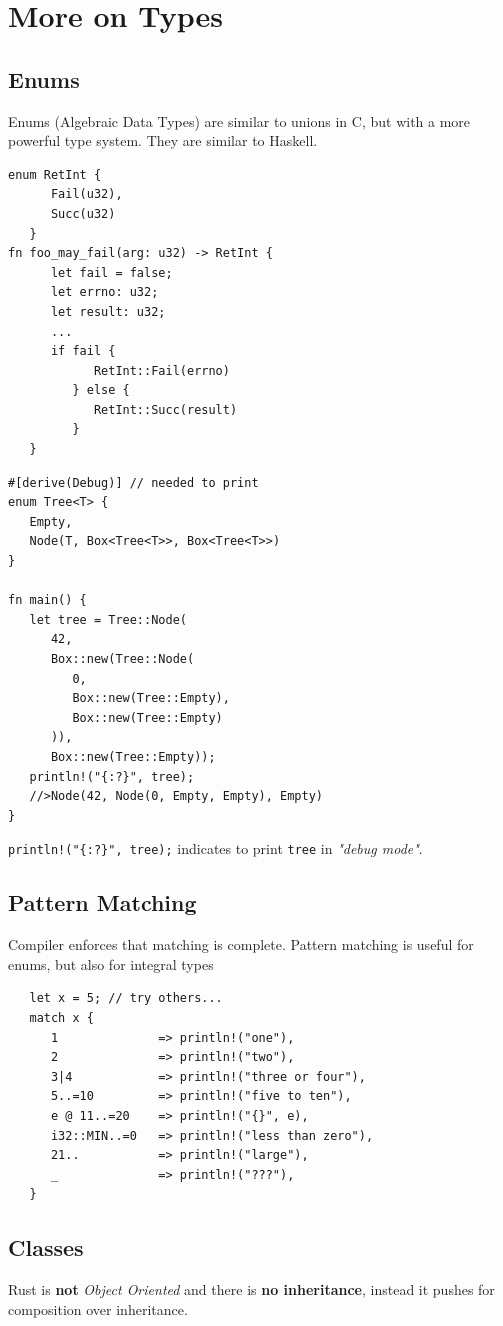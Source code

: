 \section{More on Types}
\subsection{Enums}
Enums (Algebraic Data Types) are similar to unions in C, but with a more powerful type system. They are similar to Haskell.
\begin{paracol}{2}
   \begin{lstlisting}
enum RetInt {
      Fail(u32),
      Succ(u32)
   }
fn foo_may_fail(arg: u32) -> RetInt {
      let fail = false;
      let errno: u32;
      let result: u32;
      ...
      if fail {
            RetInt::Fail(errno)
         } else {
            RetInt::Succ(result)
         }
   }
\end{lstlisting}
\switchcolumn
\begin{lstlisting}[caption={Trees as ADT}]
#[derive(Debug)] // needed to print
enum Tree<T> {
   Empty,
   Node(T, Box<Tree<T>>, Box<Tree<T>>)
}

fn main() {
   let tree = Tree::Node(
      42,
      Box::new(Tree::Node(
         0,
         Box::new(Tree::Empty),
         Box::new(Tree::Empty)
      )),
      Box::new(Tree::Empty));
   println!("{:?}", tree);
   //>Node(42, Node(0, Empty, Empty), Empty)
}
\end{lstlisting}
   \lstinline|println!("{:?}", tree);| indicates to print \lstinline|tree| in \textit{"debug mode"}.
\end{paracol}

\subsection{Pattern Matching}
Compiler enforces that matching is complete.
Pattern matching is useful for enums, but also for integral types
\begin{lstlisting}
   let x = 5; // try others...
   match x {
      1              => println!("one"),
      2              => println!("two"),
      3|4            => println!("three or four"),
      5..=10         => println!("five to ten"),
      e @ 11..=20    => println!("{}", e),
      i32::MIN..=0   => println!("less than zero"),
      21..           => println!("large"),
      _              => println!("???"),
   }
\end{lstlisting}


\subsection{Classes}
Rust is \textbf{not} \textit{Object Oriented} and there is \textbf{no inheritance}, instead it pushes for composition over inheritance.

